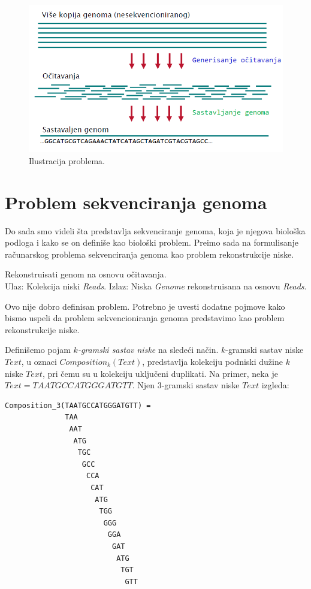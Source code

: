 \begin{figure}[h]
	\centering
	\includegraphics[width=1\textwidth]{poglavlja/3/slike/sekvencioniranje.png}
	\caption{Ilustracija problema.}
	\label{slika:sekvenciranje}
\end{figure} 

\section{Problem sekvenciranja genoma}

Do sada smo videli \v sta predstavlja sekvenciranje genoma, koja je njegova biolo\v ska podloga i kako se on defini\v se kao biolo\v ski problem. Pre\dj imo sada na formulisanje ra\v cunarskog problema sekvenciranja genoma kao problem rekonstrukcije niske.

\begin{problem} 
	Rekonstruisati genom na osnovu očitavanja. \\
	Ulaz: Kolekcija niski \emph{Reads}.
	Izlaz: Niska \emph{Genome} rekonstruisana na osnovu \emph{Reads}.
\end{problem}

Ovo nije dobro definisan problem. Potrebno je uvesti dodatne pojmove kako bismo uspeli da problem sekvencioniranja genoma predstavimo kao problem rekonstrukcije niske.

Defini\v semo pojam \emph{$k$-gramski sastav niske} na slede\'ci na\v cin. $k$-gramski sastav niske $Text$, u oznaci $Composition_k(Text)$, predstavlja kolekciju podniski dužine $k$ niske $Text$, pri \v cemu su u kolekciju uključeni duplikati. Na primer, neka je $Text=TAATGCCATGGGATGTT$. Njen $3$-gramski sastav niske $Text$ izgleda:

\newpage
\begin{lstlisting}
Composition_3(TAATGCCATGGGATGTT) =
              TAA 
               AAT 
                ATG
                 TGC
                  GCC
                   CCA
                    CAT
                     ATG
                      TGG
                       GGG
                        GGA
                         GAT
                          ATG
                           TGT
                            GTT
\end{lstlisting}

